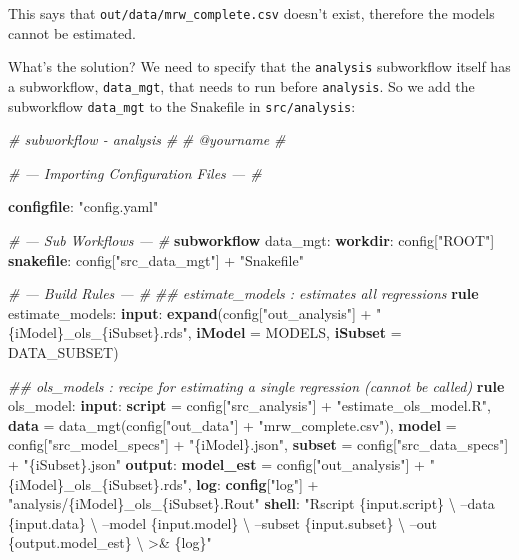 \documentclass[]{book}
\newenvironment{Shaded}{\begin{snugshade}}{\end{snugshade}}
\newcommand{\KeywordTok}[1]{\textcolor[rgb]{0.13,0.29,0.53}{\textbf{{#1}}}}
\newcommand{\StringTok}[1]{\textcolor[rgb]{0.31,0.60,0.02}{{#1}}}
\newcommand{\CommentTok}[1]{\textcolor[rgb]{0.56,0.35,0.01}{\textit{{#1}}}}
\newcommand{\NormalTok}[1]{{#1}}
\theoremstyle{definition}
\theoremstyle{definition}
\theoremstyle{definition}
\theoremstyle{remark}
\begin{document}
This says that \texttt{out/data/mrw\_complete.csv} doesn't exist,
therefore the models cannot be estimated.

What's the solution? We need to specify that the \texttt{analysis}
subworkflow itself has a subworkflow, \texttt{data\_mgt}, that needs to
run before \texttt{analysis}. So we add the subworkflow
\texttt{data\_mgt} to the Snakefile in \texttt{src/analysis}:

\begin{Shaded}
\begin{Highlighting}[]
\CommentTok{# subworkflow - analysis}
\CommentTok{#}
\CommentTok{# @yourname}
\CommentTok{#}

\CommentTok{# --- Importing Configuration Files --- #}

\KeywordTok{configfile}\NormalTok{: }\StringTok{"config.yaml"}

\CommentTok{# --- Sub Workflows --- #}
\KeywordTok{subworkflow} \NormalTok{data_mgt:}
   \KeywordTok{workdir}\NormalTok{: config[}\StringTok{"ROOT"}\NormalTok{]}
   \KeywordTok{snakefile}\NormalTok{:  config[}\StringTok{"src_data_mgt"}\NormalTok{] + }\StringTok{"Snakefile"}

\CommentTok{# --- Build Rules --- #}
\CommentTok{## estimate_models    : estimates all regressions}
\KeywordTok{rule} \NormalTok{estimate_models:}
    \KeywordTok{input}\NormalTok{:}
        \KeywordTok{expand}\NormalTok{(config[}\StringTok{"out_analysis"}\NormalTok{] + }\StringTok{"\{iModel\}_ols_\{iSubset\}.rds"}\NormalTok{,}
                    \KeywordTok{iModel} \NormalTok{= MODELS,}
                    \KeywordTok{iSubset} \NormalTok{= DATA_SUBSET)}

\CommentTok{## ols_models         : recipe for estimating a single regression (cannot be called)}
\KeywordTok{rule} \NormalTok{ols_model:}
    \KeywordTok{input}\NormalTok{:}
        \KeywordTok{script} \NormalTok{= config[}\StringTok{"src_analysis"}\NormalTok{] + }\StringTok{"estimate_ols_model.R"}\NormalTok{,}
        \KeywordTok{data}   \NormalTok{= data_mgt(config[}\StringTok{"out_data"}\NormalTok{] + }\StringTok{"mrw_complete.csv"}\NormalTok{),}
        \KeywordTok{model}  \NormalTok{= config[}\StringTok{"src_model_specs"}\NormalTok{] + }\StringTok{"\{iModel\}.json"}\NormalTok{,}
        \KeywordTok{subset} \NormalTok{= config[}\StringTok{"src_data_specs"}\NormalTok{]  + }\StringTok{"\{iSubset\}.json"}
    \KeywordTok{output}\NormalTok{:}
        \KeywordTok{model_est} \NormalTok{= config[}\StringTok{"out_analysis"}\NormalTok{] + }\StringTok{"\{iModel\}_ols_\{iSubset\}.rds"}\NormalTok{,}
    \KeywordTok{log}\NormalTok{:}
        \KeywordTok{config}\NormalTok{[}\StringTok{"log"}\NormalTok{] + }\StringTok{"analysis/\{iModel\}_ols_\{iSubset\}.Rout"}
    \KeywordTok{shell}\NormalTok{:}
        \StringTok{"Rscript \{input.script\} \textbackslash{}}
\StringTok{            --data \{input.data\} \textbackslash{}}
\StringTok{            --model \{input.model\} \textbackslash{}}
\StringTok{            --subset \{input.subset\} \textbackslash{}}
\StringTok{            --out \{output.model_est\} \textbackslash{}}
\StringTok{            >& \{log\}"}
\end{Highlighting}
\end{Shaded}
\end{document}

